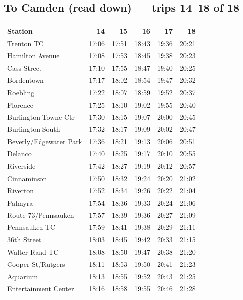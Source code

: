 \subsection*{To Camden (read down) --- trips 14--18 of 18}
\begin{center}\footnotesize\setlength{\tabcolsep}{3pt}\begin{tabular}{@{}lrrrrr@{}}\toprule
Station & 14 & 15 & 16 & 17 & 18 \\\midrule
Trenton TC & 17:06 & 17:51 & 18:43 & 19:36 & 20:21 \\
Hamilton Avenue & 17:08 & 17:53 & 18:45 & 19:38 & 20:23 \\
Cass Street & 17:10 & 17:55 & 18:47 & 19:40 & 20:25 \\
Bordentown & 17:17 & 18:02 & 18:54 & 19:47 & 20:32 \\
Roebling & 17:22 & 18:07 & 18:59 & 19:52 & 20:37 \\
Florence & 17:25 & 18:10 & 19:02 & 19:55 & 20:40 \\
Burlington Towne Ctr & 17:30 & 18:15 & 19:07 & 20:00 & 20:45 \\
Burlington South & 17:32 & 18:17 & 19:09 & 20:02 & 20:47 \\
Beverly/Edgewater Park & 17:36 & 18:21 & 19:13 & 20:06 & 20:51 \\
Delanco & 17:40 & 18:25 & 19:17 & 20:10 & 20:55 \\
Riverside & 17:42 & 18:27 & 19:19 & 20:12 & 20:57 \\
Cinnaminson & 17:50 & 18:32 & 19:24 & 20:20 & 21:02 \\
Riverton & 17:52 & 18:34 & 19:26 & 20:22 & 21:04 \\
Palmyra & 17:54 & 18:36 & 19:33 & 20:24 & 21:06 \\
Route 73/Pennsauken & 17:57 & 18:39 & 19:36 & 20:27 & 21:09 \\
Pennsauken TC & 17:59 & 18:41 & 19:38 & 20:29 & 21:11 \\
36th Street & 18:03 & 18:45 & 19:42 & 20:33 & 21:15 \\
Walter Rand TC & 18:08 & 18:50 & 19:47 & 20:38 & 21:20 \\
Cooper St/Rutgers & 18:11 & 18:53 & 19:50 & 20:41 & 21:23 \\
Aquarium & 18:13 & 18:55 & 19:52 & 20:43 & 21:25 \\
Entertainment Center & 18:16 & 18:58 & 19:55 & 20:46 & 21:28 \\
\bottomrule\end{tabular}\end{center}
\clearpage
